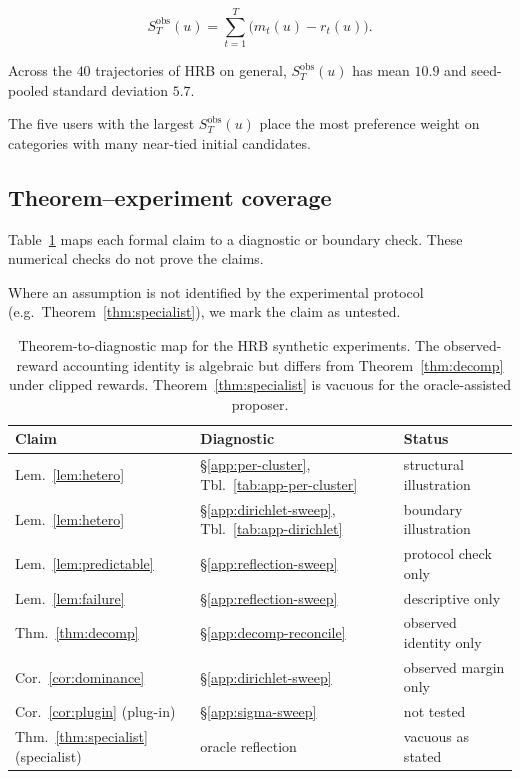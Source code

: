 \documentclass{article} %
\begin{document}
\begin{equation}
\label{eq:app-per-user-residual}
S_T^{\mathrm{obs}}(u)
=
\sum_{t=1}^{T}\big(m_t(u)-r_t(u)\big).
\end{equation}

Across the \(40\) trajectories of HRB on general,
\(S_T^{\mathrm{obs}}(u)\) has mean \(10.9\) and seed-pooled standard deviation
\(5.7\).

The five users with the largest \(S_T^{\mathrm{obs}}(u)\) place the most
preference weight on categories with many near-tied initial candidates.

\subsection{Theorem--experiment coverage}

\label{app:coverage-map}

Table~\ref{tab:app-coverage-sweeps} maps each formal claim to a diagnostic or
boundary check. These numerical checks do not prove the claims.

Where an assumption is not identified by the experimental protocol (e.g.\ Theorem~\ref{thm:specialist}), we mark the claim as untested.

\begin{table}[h]
\centering
\small
\begin{tabular}{lll}
\toprule
Claim & Diagnostic & Status \\
\midrule
Lem.~\ref{lem:hetero} & \S\ref{app:per-cluster}, Tbl.~\ref{tab:app-per-cluster} & structural illustration \\
Lem.~\ref{lem:hetero} & \S\ref{app:dirichlet-sweep}, Tbl.~\ref{tab:app-dirichlet} & boundary illustration \\
Lem.~\ref{lem:predictable} & \S\ref{app:reflection-sweep} & protocol check only \\
Lem.~\ref{lem:failure} & \S\ref{app:reflection-sweep} & descriptive only \\
Thm.~\ref{thm:decomp} & \S\ref{app:decomp-reconcile} & observed identity only \\
Cor.~\ref{cor:dominance} & \S\ref{app:dirichlet-sweep} & observed margin only \\
Cor.~\ref{cor:plugin} (plug-in) & \S\ref{app:sigma-sweep} & not tested \\
Thm.~\ref{thm:specialist} (specialist) & oracle reflection & vacuous as stated \\
\bottomrule
\end{tabular}
\caption{Theorem-to-diagnostic map for the HRB synthetic experiments. The observed-reward accounting identity is
algebraic but differs from Theorem~\ref{thm:decomp} under clipped rewards.
Theorem~\ref{thm:specialist} is vacuous for the oracle-assisted proposer.}
\label{tab:app-coverage-sweeps}
\end{table}
\end{document}
